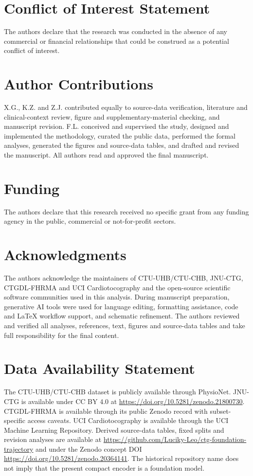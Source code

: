 \documentclass[utf8]{FrontiersinHarvard}
\begin{document}
\section*{Conflict of Interest Statement}
The authors declare that the research was conducted in the absence of any commercial or financial relationships that could be construed as a potential conflict of interest.

\section*{Author Contributions}
X.G., K.Z. and Z.J. contributed equally to source-data verification, literature and clinical-context review, figure and supplementary-material checking, and manuscript revision. F.L. conceived and supervised the study, designed and implemented the methodology, curated the public data, performed the formal analyses, generated the figures and source-data tables, and drafted and revised the manuscript. All authors read and approved the final manuscript.

\section*{Funding}
The authors declare that this research received no specific grant from any funding agency in the public, commercial or not-for-profit sectors.

\section*{Acknowledgments}
The authors acknowledge the maintainers of CTU-UHB/CTU-CHB, JNU-CTG, CTGDL-FHRMA and UCI Cardiotocography and the open-source scientific software communities used in this analysis. During manuscript preparation, generative AI tools were used for language editing, formatting assistance, code and LaTeX workflow support, and schematic refinement. The authors reviewed and verified all analyses, references, text, figures and source-data tables and take full responsibility for the final content.

\section*{Data Availability Statement}
The CTU-UHB/CTU-CHB dataset is publicly available through PhysioNet. JNU-CTG is available under CC BY 4.0 at \url{https://doi.org/10.5281/zenodo.21800730}. CTGDL-FHRMA is available through its public Zenodo record with subset-specific access caveats. UCI Cardiotocography is available through the UCI Machine Learning Repository. Derived source-data tables, fixed splits and revision analyses are available at \url{https://github.com/Luciky-Leo/ctg-foundation-trajectory} and under the Zenodo concept DOI \url{https://doi.org/10.5281/zenodo.20364141}. The historical repository name does not imply that the present compact encoder is a foundation model.

\setlength{\bibsep}{0pt}


\end{document}
